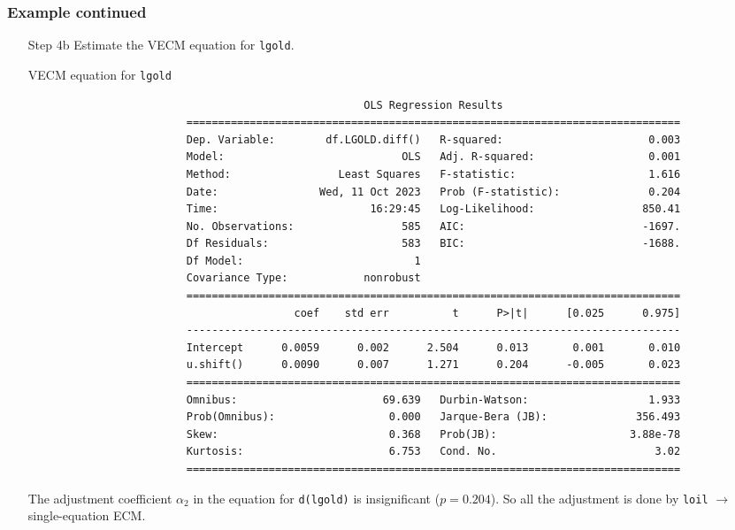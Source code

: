 \begin{frame}[fragile]\frametitle{Example continued}
\begin{itemize}
\item[Step 4b] Estimate the VECM equation for \texttt{lgold}.
\begin{block}{VECM equation for \texttt{lgold}}
\tiny
\begin{verbatim}
                                                     OLS Regression Results                            
                         ==============================================================================
                         Dep. Variable:        df.LGOLD.diff()   R-squared:                       0.003
                         Model:                            OLS   Adj. R-squared:                  0.001
                         Method:                 Least Squares   F-statistic:                     1.616
                         Date:                Wed, 11 Oct 2023   Prob (F-statistic):              0.204
                         Time:                        16:29:45   Log-Likelihood:                 850.41
                         No. Observations:                 585   AIC:                            -1697.
                         Df Residuals:                     583   BIC:                            -1688.
                         Df Model:                           1                                         
                         Covariance Type:            nonrobust                                         
                         ==============================================================================
                                          coef    std err          t      P>|t|      [0.025      0.975]
                         ------------------------------------------------------------------------------
                         Intercept      0.0059      0.002      2.504      0.013       0.001       0.010
                         u.shift()      0.0090      0.007      1.271      0.204      -0.005       0.023
                         ==============================================================================
                         Omnibus:                       69.639   Durbin-Watson:                   1.933
                         Prob(Omnibus):                  0.000   Jarque-Bera (JB):              356.493
                         Skew:                           0.368   Prob(JB):                     3.88e-78
                         Kurtosis:                       6.753   Cond. No.                         3.02
                         ==============================================================================
\end{verbatim}
\end{block}
		The adjustment coefficient $\alpha_2$ in the equation for \texttt{d(lgold)} is insignificant ($p=0.204$). So all the adjustment is done by \texttt{loil} $\rightarrow$ single-equation ECM.
	\end{itemize}
\end{frame}
